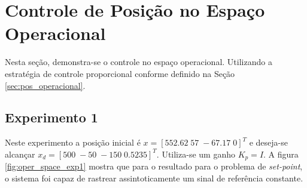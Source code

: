 \section{Controle de Posição no Espaço Operacional}

Nesta seção, demonstra-se o controle no espaço operacional. Utilizando a estratégia de controle proporcional conforme definido na Seção \ref{sec:pos_operacional}. 

\subsection{Experimento 1}

Neste experimento a posição inicial é ${x} =[ 552.62 \; 57 \; -67.17 \; 0]^T$ e deseja-se alcançar ${x}_d =[ 500 \; -50 \; -150 \; 0.5235]^T$. Utiliza-se um ganho ${K}_p = {I}$. A figura \ref{fig:oper_space_exp1} mostra que para o resultado para o problema de \textit{set-point}, o sistema foi capaz de rastrear assintoticamente um sinal de referência constante. 

